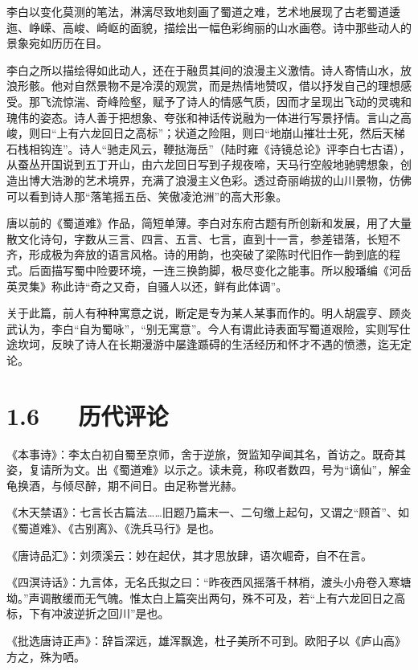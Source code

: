 \documentclass[letterpaper,10pt,english]{sphinxmanual}
\begin{document}
李白以变化莫测的笔法，淋漓尽致地刻画了蜀道之难，艺术地展现了古老蜀道逶迤、峥嵘、高峻、崎岖的面貌，描绘出一幅色彩绚丽的山水画卷。诗中那些动人的景象宛如历历在目。

李白之所以描绘得如此动人，还在于融贯其间的浪漫主义激情。诗人寄情山水，放浪形骸。他对自然景物不是冷漠的观赏，而是热情地赞叹，借以抒发自己的理想感受。那飞流惊湍、奇峰险壑，赋予了诗人的情感气质，因而才呈现出飞动的灵魂和瑰伟的姿态。诗人善于把想象、夸张和神话传说融为一体进行写景抒情。言山之高峻，则曰“上有六龙回日之高标”；状道之险阻，则曰“地崩山摧壮士死，然后天梯石栈相钩连”。诗人“驰走风云，鞭挞海岳”（陆时雍《诗镜总论》评李白七古语），从蚕丛开国说到五丁开山，由六龙回日写到子规夜啼，天马行空般地驰骋想象，创造出博大浩渺的艺术境界，充满了浪漫主义色彩。透过奇丽峭拔的山川景物，仿佛可以看到诗人那“落笔摇五岳、笑傲凌沧洲”的高大形象。

唐以前的《蜀道难》作品，简短单薄。李白对东府古题有所创新和发展，用了大量散文化诗句，字数从三言、四言、五言、七言，直到十一言，参差错落，长短不齐，形成极为奔放的语言风格。诗的用韵，也突破了梁陈时代旧作一韵到底的程式。后面描写蜀中险要环境，一连三换韵脚，极尽变化之能事。所以殷璠编《河岳英灵集》称此诗“奇之又奇，自骚人以还，鲜有此体调”。

关于此篇，前人有种种寓意之说，断定是专为某人某事而作的。明人胡震亨、顾炎武认为，李白“自为蜀咏”，“别无寓意”。今人有谓此诗表面写蜀道艰险，实则写仕途坎坷，反映了诗人在长期漫游中屡逢踬碍的生活经历和怀才不遇的愤懑，迄无定论。


\section{1.6   历代评论}
\label{\detokenize{p01_u6563_u6587/_u674e_u767d-_u8700_u9053_u96be:id8}}
《本事诗》：李太白初自蜀至京师，舍于逆旅，贺监知孕闻其名，首访之。既奇其姿，复请所为文。出《蜀道难》以示之。读未竟，称叹者数四，号为“谪仙”，解金龟换酒，与倾尽醉，期不间日。由足称誉光赫。

《木天禁语》：七言长古篇法……旧题乃篇末一、二句缴上起句，又谓之“顾首”、如《蜀道难》、《古别离》、《洗兵马行》是也。

《唐诗品汇》：刘须溪云：妙在起伏，其才思放肆，语次崛奇，自不在言。

《四溟诗话》：九言体，无名氏拟之曰：“昨夜西风摇落千林梢，渡头小舟卷入寒塘坳。”声调散缓而无气魄。惟太白上篇突出两句，殊不可及，若“上有六龙回日之高标，下有冲波逆折之回川”是也。

《批选唐诗正声》：辞旨深远，雄浑飘逸，杜子美所不可到。欧阳子以《庐山高》方之，殊为哂。
\end{document}
